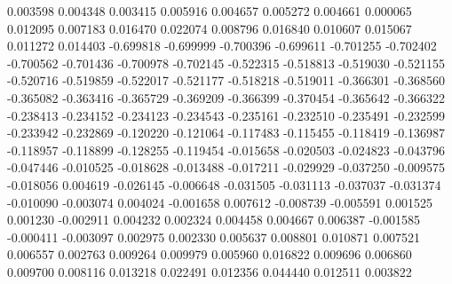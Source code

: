 0.003598
0.004348
0.003415
0.005916
0.004657
0.005272
0.004661
0.000065
0.012095
0.007183
0.016470
0.022074
0.008796
0.016840
0.010607
0.015067
0.011272
0.014403
-0.699818
-0.699999
-0.700396
-0.699611
-0.701255
-0.702402
-0.700562
-0.701436
-0.700978
-0.702145
-0.522315
-0.518813
-0.519030
-0.521155
-0.520716
-0.519859
-0.522017
-0.521177
-0.518218
-0.519011
-0.366301
-0.368560
-0.365082
-0.363416
-0.365729
-0.369209
-0.366399
-0.370454
-0.365642
-0.366322
-0.238413
-0.234152
-0.234123
-0.234543
-0.235161
-0.232510
-0.235491
-0.232599
-0.233942
-0.232869
-0.120220
-0.121064
-0.117483
-0.115455
-0.118419
-0.136987
-0.118957
-0.118899
-0.128255
-0.119454
-0.015658
-0.020503
-0.024823
-0.043796
-0.047446
-0.010525
-0.018628
-0.013488
-0.017211
-0.029929
-0.037250
-0.009575
-0.018056
0.004619
-0.026145
-0.006648
-0.031505
-0.031113
-0.037037
-0.031374
-0.010090
-0.003074
0.004024
-0.001658
0.007612
-0.008739
-0.005591
0.001525
0.001230
-0.002911
0.004232
0.002324
0.004458
0.004667
0.006387
-0.001585
-0.000411
-0.003097
0.002975
0.002330
0.005637
0.008801
0.010871
0.007521
0.006557
0.002763
0.009264
0.009979
0.005960
0.016822
0.009696
0.006860
0.009700
0.008116
0.013218
0.022491
0.012356
0.044440
0.012511
0.003822
